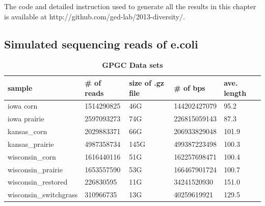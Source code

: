 The code and detailed instruction used to generate all the results in this 
chapter is available at
http://github.com/ged-lab/2013-diversity/. 


\subsection{Simulated sequencing reads of e.coli}




\begin{table}[h]
\caption{\bf{GPGC Data sets}}
\label{my-label}
\begin{tabular}{|l|l|l|l|l|}
\hline
sample & \# of reads & size of .gz file & \# of bps & ave. length \\ \hline
iowa corn & 1514290825 & 46G & 144202427079 & 95.2 \\ \hline
iowa prairie & 2597093273 & 74G & 226815059143 & 87.3 \\ \hline
kansas\_corn & 2029883371 & 66G & 206933829048 & 101.9 \\ \hline
kansas\_prairie & 4987358734 & 145G & 499387223498 & 100.3 \\ \hline
wisconsin\_corn & 1616440116 & 51G & 162257698471 & 100.4 \\ \hline
wisconsin\_prairie & 1653557590 & 53G & 166467901724 & 100.7 \\ \hline
wisconsin\_restored & 226830595 & 11G & 34241520930 & 151.0 \\ \hline
wisconsin\_switchgrass & 310966735 & 13G & 40259619921 & 129.5 \\ \hline
\end{tabular}
\label{table:gpgc}
\end{table}

